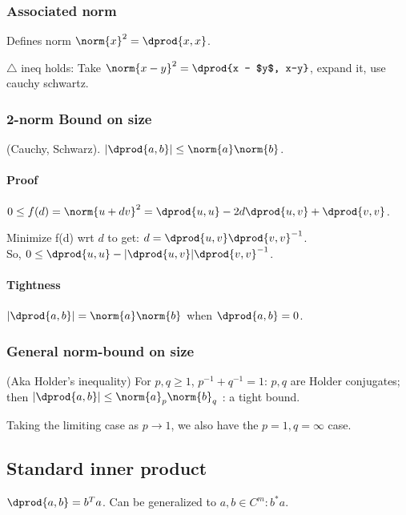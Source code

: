 \documentclass[oneside, article]{memoir}
\begin{document}
\subsubsection{Associated norm}
Defines norm $\norm{x}^{2} = \dprod{x,x}$.

$\triangle$ ineq holds: Take $\norm{x- y}^{2} = \dprod{x - $y$, x-y}$, expand it, use cauchy schwartz.

\subsubsection{2-norm Bound on size}
(Cauchy, Schwarz). $|\dprod{a,b}| \leq \norm{a}\norm{b}$.

\paragraph*{Proof}
$0 \leq f(d) = \norm{u + dv}^{2} = \dprod{u, u} - 2d \dprod{u, v} + \dprod{v, v}$.

Minimize f(d) wrt $d$ to get: $d = \dprod{u, v}\dprod{v, v}^{-1}$.\\ So, $0 \leq \dprod{u, u} - |\dprod{u, v}|\dprod{v, v}^{-1}$.

\paragraph*{Tightness}
$|\dprod{a,b}| = \norm{a}\norm{b}$ when $\dprod{a, b} = 0$.

\subsubsection{General norm-bound on size}
(Aka Holder's inequality) For $p, q \geq 1$, $p^{-1} + q^{-1} =1$: $p, q$ are Holder conjugates; then $|\dprod{a,b}| \leq \norm{a}_{p}\norm{b}_{q}$ : a tight bound.


Taking the limiting case as $p \to 1$, we also have the $p=1, q = \infty$ case.

\subsection{Standard inner product}
$\dprod{a, b} = b^{T}a$. Can be generalized to $a, b \in C^{m}: b^{*}a$.
\end{document}
